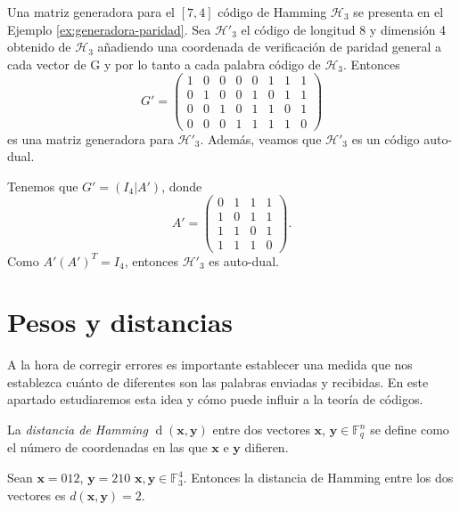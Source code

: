 \begin{exampleth}
    Una matriz generadora para el $[7, 4]$ código de Hamming $\mathcal{H}_3$ se presenta en el Ejemplo \ref{ex:generadora-paridad}. Sea $\mathcal{H'}_3$ el código de longitud 8 y dimensión 4 obtenido de $\mathcal{H}_3$ añadiendo una coordenada de verificación de paridad general a cada vector de G y por lo tanto a cada palabra código de $\mathcal{H}_3$. Entonces 
    \[
        G' = \left( 
        \begin{array}{cccc|cccc}  
            1 & 0 & 0 & 0 & 0 & 1 & 1 & 1 \\
            0 & 1 & 0 & 0 & 1 & 0 & 1 & 1\\
            0 & 0 & 1 & 0 & 1 & 1 & 0 & 1\\
            0 & 0 & 0 & 1 & 1 & 1 & 1 & 0
        \end{array} 
        \right)
    \]
    es una matriz generadora para $\mathcal{H'}_3$. Además, veamos que $\mathcal{H'}_3$ es un código auto-dual.

    Tenemos que $G' = (I_4 | A')$, donde
    \[
        A' = \left( 
        \begin{array}{cccc}  
            0 & 1 & 1 & 1 \\
            1 & 0 & 1 & 1\\
            1 & 1 & 0 & 1\\
            1 & 1 & 1 & 0
        \end{array} 
        \right) .
    \]
    Como $A' (A')^T = I_4$, entonces $\mathcal{H'}_3$ es auto-dual.
\end{exampleth}

\section{Pesos y distancias}

A la hora de corregir errores es importante establecer una medida que nos establezca cuánto de diferentes son las palabras enviadas y recibidas. En este apartado estudiaremos esta idea y cómo puede influir a la teoría de códigos.

\begin{definition}
    La \emph{distancia de Hamming} $\operatorname{d}(\mathbf{x},\mathbf{y})$ entre dos vectores $\mathbf{x}$, $\mathbf{y} \in \mathbb{F}_q^n$ se define como el número de coordenadas en las que $\mathbf{x}$ e $\mathbf{y}$ difieren.
\end{definition}

\begin{exampleth}
    Sean $\mathbf{x} = 012$, $\mathbf{y} = 210$ $\mathbf{x}, \mathbf{y} \in \mathbb{F}_3^4$. Entonces la distancia de Hamming entre los dos vectores es $d(\mathbf{x}, \mathbf{y}) = 2$.
\end{exampleth}

